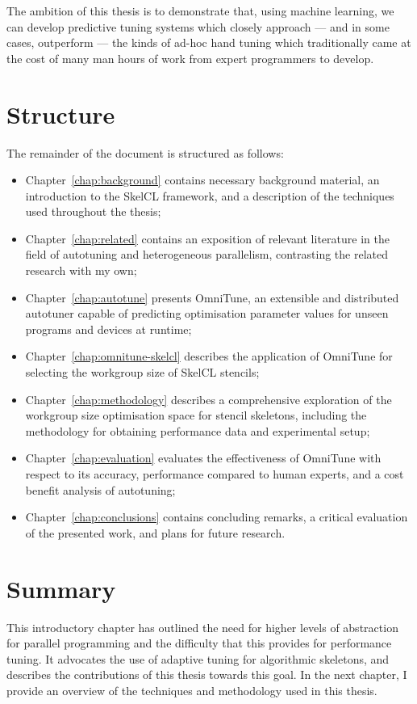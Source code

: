 The ambition of this thesis is to demonstrate that, using machine
learning, we can develop predictive tuning systems which closely
approach --- and in some cases, outperform --- the kinds of ad-hoc
hand tuning which traditionally came at the cost of many man hours of
work from expert programmers to develop.


\section{Structure}

The remainder of the document is structured as follows:
%
\begin{itemize}
\item Chapter~\ref{chap:background} contains necessary background
  material, an introduction to the SkelCL framework, and a description
  of the techniques used throughout the thesis;
\item Chapter~\ref{chap:related} contains an exposition of relevant
  literature in the field of autotuning and heterogeneous parallelism,
  contrasting the related research with my own;
\item Chapter~\ref{chap:autotune} presents OmniTune, an extensible and
  distributed autotuner capable of predicting optimisation parameter
  values for unseen programs and devices at runtime;
\item Chapter~\ref{chap:omnitune-skelcl} describes the application of
  OmniTune for selecting the workgroup size of SkelCL stencils;
\item Chapter~\ref{chap:methodology} describes a comprehensive
  exploration of the workgroup size optimisation space for stencil
  skeletons, including the methodology for obtaining performance data
  and experimental setup;
\item Chapter~\ref{chap:evaluation} evaluates the effectiveness of
  OmniTune with respect to its accuracy, performance compared to human
  experts, and a cost benefit analysis of autotuning;
\item Chapter~\ref{chap:conclusions} contains concluding remarks, a
  critical evaluation of the presented work, and plans for future
  research.
\end{itemize}


\section{Summary}

This introductory chapter has outlined the need for higher levels of
abstraction for parallel programming and the difficulty that this
provides for performance tuning. It advocates the use of adaptive
tuning for algorithmic skeletons, and describes the contributions of
this thesis towards this goal. In the next chapter, I provide an
overview of the techniques and methodology used in this thesis.
